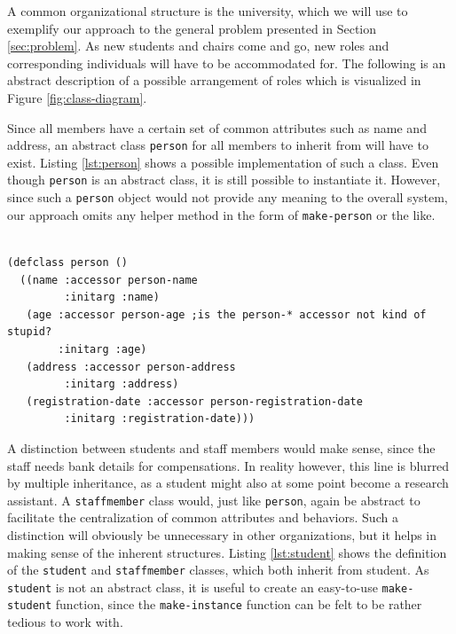 \documentclass[oribibl]{llncs}
\begin{document}
A common organizational structure is the university, which we will use to exemplify our approach to the general problem presented in Section \ref{sec:problem}. As new students and chairs come and go, new roles and corresponding individuals will have to be accommodated for. The following is an abstract description of a possible arrangement of roles which is visualized in Figure \ref{fig:class-diagram}. 

Since all members have a certain set of common attributes such as name and address, an abstract class \texttt{person} for all members to inherit from will have to exist. Listing \ref{lst:person} shows a possible implementation of such a class. Even though \texttt{person} is an abstract class, it is still possible to instantiate it. However, since such a \texttt{person} object would not provide any meaning to the overall system, our approach omits any helper method in the form of \texttt{make-person} or the like.

\begin{listing}[]%
\begin{verbatim}

(defclass person ()
  ((name :accessor person-name
         :initarg :name)
   (age :accessor person-age ;is the person-* accessor not kind of stupid?
        :initarg :age)
   (address :accessor person-address
         :initarg :address)
   (registration-date :accessor person-registration-date
         :initarg :registration-date)))
\end{verbatim}
\caption{The basic \texttt{person} class}
\label{lst:person}
\end{listing}

A distinction between students and staff members would make sense, since the staff needs bank details for compensations. In reality however, this line is blurred by multiple inheritance, as a student might also at some point become a research assistant. A \texttt{staffmember} class would, just like \texttt{person}, again be abstract to facilitate the centralization of common attributes and behaviors. Such a distinction will obviously be unnecessary in other organizations, but it helps in making sense of the inherent structures. Listing \ref{lst:student} shows the definition of the \texttt{student} and \texttt{staffmember} classes, which both inherit from student. As \texttt{student} is not an abstract class, it is useful to create an easy-to-use \texttt{make-student} function, since the \texttt{make-instance} function can be felt to be rather tedious to work with.
\end{document}
